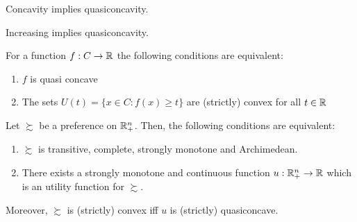 \documentclass[12pt]{extarticle}
\begin{document}
\begin{remark}{}{}
    Concavity implies quasiconcavity.
\end{remark}
\begin{remark}{}{}
    Increasing implies quasiconcavity.
\end{remark}

\begin{proposition}{}{}
    For a function $f: C \to \mathbb{R}$ the following conditions are equivalent:
    \begin{enumerate}[label=\roman*.]
        \item $f$ is quasi concave
        \item The sets $U(t) = \{ x \in C : f(x) \geq t \}$ are (strictly) convex for all $t \in \mathbb{R}$
    \end{enumerate}
\end{proposition}

\begin{theorem}{}{}
    Let $\succsim$ be a preference on $\mathbb{R}^n_+$.
    Then, the following conditions are equivalent:
    \begin{enumerate}[label=\roman*.]
        \item $\succsim$ is transitive, complete, strongly monotone and Archimedean.
        \item There exists a strongly monotone and continuous function $u: \mathbb{R}^n_+ \to \mathbb{R}$ which is an utility function for $\succsim$.
    \end{enumerate}

    Moreover, $\succsim$ is (strictly) convex iff $u$ is (strictly) quasiconcave.
\end{theorem}
\end{document}
